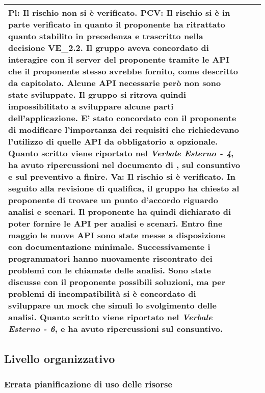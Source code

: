 \begin{table}[H]
\begin{center}
\begin{tabular}{p{2.5cm}p{0.5cm}p{11cm}}
				\textbf{Pl}: Il rischio non si è verificato.
				\newline
				\textbf{PCV}: Il rischio si è in parte verificato in quanto il proponente ha ritrattato quanto stabilito in precedenza e trascritto nella decisione VE\_2.2. Il gruppo aveva concordato di interagire con il server del proponente tramite le API che il proponente stesso avrebbe fornito, come descritto da capitolato. Alcune API necessarie però non sono state sviluppate. Il gruppo si ritrova quindi impossibilitato a sviluppare alcune parti dell'applicazione. E' stato concordato con il proponente di modificare l'importanza dei requisiti che richiedevano l'utilizzo di quelle API da obbligatorio a opzionale. Quanto scritto viene riportato nel \textit{Verbale Esterno - 4}, ha avuto ripercussioni nel documento di \adr{}, sul consuntivo e sul preventivo a finire.
				\newline
				\textbf{Va}: Il rischio si è verificato. In seguito alla revisione di qualifica, il gruppo ha chiesto al proponente di trovare un punto d'accordo riguardo analisi e scenari. Il proponente ha quindi dichiarato di poter fornire le API per analisi e scenari. Entro fine maggio le nuove API sono state messe a disposizione con documentazione minimale. Successivamente i programmatori hanno nuovamente riscontrato dei problemi con le chiamate delle analisi. Sono state discusse con il proponente possibili soluzioni, ma per problemi di incompatibilità si è concordato di sviluppare un mock che simuli lo svolgimento delle analisi. Quanto scritto viene riportato nel \textit{Verbale Esterno - 6}, e ha avuto ripercussioni sul consuntivo.
				\\
				\bottomrule	
			\end{tabular}
		\end{center}
	\end{table}			
	
	
	\newpage
	\subsection{Livello organizzativo}
	\subsubsection {Errata pianificazione di uso delle risorse}
	\label{subsec:errataPianificazione}
	
